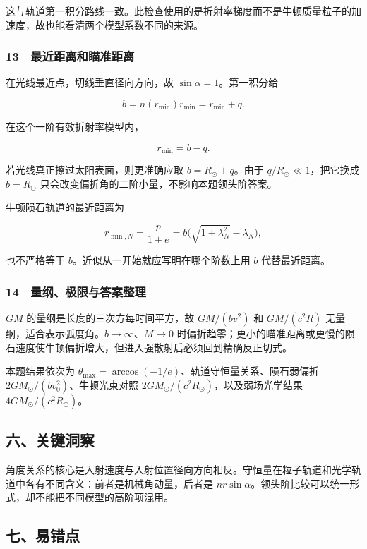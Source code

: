 \documentclass[12pt,a4paper,fontset=fandol]{ctexart}
\begin{document}
这与轨道第一积分路线一致。此检查使用的是折射率梯度而不是牛顿质量粒子的加速度，故也能看清两个模型系数不同的来源。

\subsubsection{13　最近距离和瞄准距离}\label{ux6700ux8fd1ux8dddux79bbux548cux7784ux51c6ux8dddux79bb}

在光线最近点，切线垂直径向方向，故 \(\sin\alpha=1\)。第一积分给

\[b=n(r_{\min})r_{\min}=r_{\min}+q.\]

在这个一阶有效折射率模型内，

\[r_{\min}=b-q.\]

若光线真正擦过太阳表面，则更准确应取 \(b=R_\odot+q\)。由于
\(q/R_\odot\ll1\)，把它换成 \(b=R_\odot\)
只会改变偏折角的二阶小量，不影响本题领头阶答案。

牛顿陨石轨道的最近距离为

\[r_{\min,N}=\frac{p}{1+e}
=b\big(\sqrt{1+\lambda_N^2}-\lambda_N\big),\]

也不严格等于 \(b\)。近似从一开始就应写明在哪个阶数上用 \(b\)
代替最近距离。

\subsubsection{14　量纲、极限与答案整理}\label{ux91cfux7eb2ux6781ux9650ux4e0eux7b54ux6848ux6574ux7406}

\(GM\) 的量纲是长度的三次方每时间平方，故 \(GM/(bv^2)\) 和 \(GM/(c^2R)\)
无量纲，适合表示弧度角。\(b\to\infty\)、\(M\to0\)
时偏折趋零；更小的瞄准距离或更慢的陨石速度使牛顿偏折增大，但进入强散射后必须回到精确反正切式。

本题结果依次为
\(\theta_{\max}=\arccos(-1/e)\)、轨道守恒量关系、陨石弱偏折
\(2GM_\odot/(bv_0^2)\)、牛顿光束对照
\(2GM_\odot/(c^2R_\odot)\)，以及弱场光学结果
\(4GM_\odot/(c^2R_\odot)\)。

\subsection{六、关键洞察}\label{ux516dux5173ux952eux6d1eux5bdf-5}

角度关系的核心是入射速度与入射位置径向方向相反。守恒量在粒子轨道和光学轨道中各有不同含义：前者是机械角动量，后者是
\(nr\sin\alpha\)。领头阶比较可以统一形式，却不能把不同模型的高阶项混用。

\subsection{七、易错点}\label{ux4e03ux6613ux9519ux70b9-5}
\end{document}
